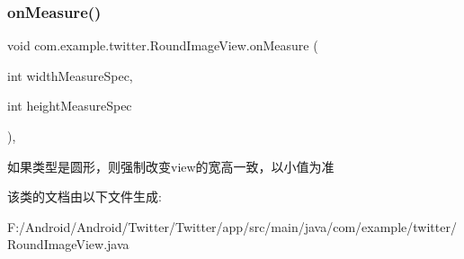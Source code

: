 \subsubsection{\texorpdfstring{on\+Measure()}{onMeasure()}}
{\footnotesize\ttfamily void com.\+example.\+twitter.\+Round\+Image\+View.\+on\+Measure (\begin{DoxyParamCaption}\item[{int}]{width\+Measure\+Spec,  }\item[{int}]{height\+Measure\+Spec }\end{DoxyParamCaption})\hspace{0.3cm}{\ttfamily [inline]}, {\ttfamily [protected]}}

如果类型是圆形，则强制改变view的宽高一致，以小值为准

该类的文档由以下文件生成\+:\begin{DoxyCompactItemize}
\item 
F\+:/\+Android/\+Android/\+Twitter/\+Twitter/app/src/main/java/com/example/twitter/Round\+Image\+View.\+java\end{DoxyCompactItemize}
